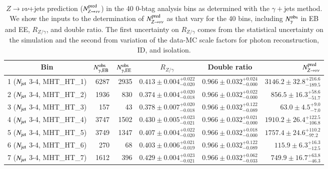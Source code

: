 


\begin{table}[h]
\caption{$Z\to\nu\nu$+jets prediction ($N_{Z\to\nu\nu}^{\rm pred}$) in
  the 40 0-btag analysis bins as determined with the $\gamma +$jets method.  We
  show the inputs to the determination of $N_{Z\to\nu\nu}^{\rm pred}$ as
   that vary for the 40 bins, including
  $N_{\gamma}^{\rm obs}$ in EB and EE, $R_{Z/\gamma}$, and double ratio. The first
  uncertainty on $R_{Z/\gamma}$ comes from the statistical uncertainty on the
  simulation and the second from
  variation of the data-MC scale factors for photon reconstruction, ID,
  and isolation.  
}
\label{tab:gjets_res}
\hspace{-1.0in}\begin{tabular}{|c|rr|c|c|r|}
\hline
Bin & $N_{\gamma, {\rm EB}}^{\rm obs}$ & $N_{\gamma, {\rm EE}}^{\rm obs}$ & $R_{Z/\gamma}$ & Double ratio  &  $N_{Z\to\nu\nu}^{\rm pred}$ \\
\hline
 1 ($N_{\rm jet}$ 3-4, MHT\_HT\_1)    & 6287 &  2935 & $0.413\pm0.004^{+0.022}_{-0.020}$ & $0.966\pm0.032^{+0.024}_{-0.000}$ & $3146.2\pm32.8^{+216.6}_{-189.5}$ \\  
 2 ($N_{\rm jet}$ 3-4, MHT\_HT\_2)    & 1936 &   830 & $0.374\pm0.004^{+0.020}_{-0.018}$ & $0.966\pm0.032^{+0.022}_{-0.000}$ & $ 856.5\pm16.3^{+58.6}_{-51.7}$ \\      
 3 ($N_{\rm jet}$ 3-4, MHT\_HT\_3)    &  157 &    43 & $0.378\pm0.007^{+0.020}_{-0.018}$ & $0.966\pm0.032^{+0.122}_{-0.089}$ & $  63.0\pm 4.5^{+ 9.0}_{- 7.0}$ \\      
 4 ($N_{\rm jet}$ 3-4, MHT\_HT\_4)    & 3747 &  1502 & $0.430\pm0.005^{+0.023}_{-0.021}$ & $0.966\pm0.032^{+0.021}_{-0.000}$ & $1910.2\pm26.4^{+122.5}_{-106.8}$ \\  
 5 ($N_{\rm jet}$ 3-4, MHT\_HT\_5)    & 3749 &  1347 & $0.407\pm0.004^{+0.022}_{-0.020}$ & $0.966\pm0.032^{+0.018}_{-0.000}$ & $1757.4\pm24.6^{+110.2}_{-97.2}$ \\     
 6 ($N_{\rm jet}$ 3-4, MHT\_HT\_6)    &  270 &    68 & $0.403\pm0.006^{+0.021}_{-0.019}$ & $0.966\pm0.032^{+0.122}_{-0.089}$ & $ 115.9\pm 6.3^{+16.3}_{-12.5}$ \\      
 7 ($N_{\rm jet}$ 3-4, MHT\_HT\_7)    & 1612 &   396 & $0.429\pm0.004^{+0.023}_{-0.021}$ & $0.966\pm0.032^{+0.062}_{-0.033}$ & $ 749.9\pm16.7^{+63.8}_{-46.3}$ \\      

\end{tabular}
\end{table}
